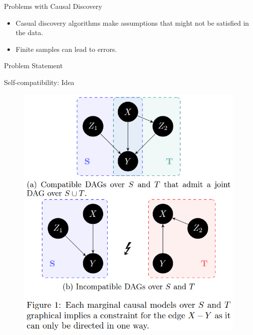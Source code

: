 \documentclass{beamer}
\begin{document}
\begin{frame}{Problems with Causal Discovery}
	\begin{itemize}
		\item Casual discovery algorithms make assumptions that might not be satisfied in the data.
		\item Finite samples can lead to errors.
	\end{itemize}
\end{frame}

\begin{frame}{Problem Statement}
\end{frame}

\begin{frame}{Self-compatibility: Idea}
	\begin{figure}
		\centering
		\includegraphics[scale=0.3]{imgs/example.png}
	\end{figure}
\end{frame}
\end{document}

